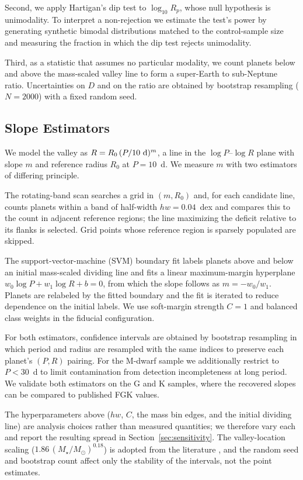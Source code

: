 \documentclass[twocolumn]{aastex701}
\newcommand{\msun}{M_\odot}
\newcommand{\slope}{m}
\begin{document}
Second, we apply Hartigan's dip test to $\log_{10} R_p$, whose null hypothesis
is unimodality. To interpret a non-rejection we estimate the test's power by
generating synthetic bimodal distributions matched to the control-sample size
and measuring the fraction in which the dip test rejects unimodality.

Third, as a statistic that assumes no particular modality, we count planets
below and above the mass-scaled valley line to form a super-Earth to
sub-Neptune ratio. Uncertainties on $D$ and on the ratio are obtained by
bootstrap resampling ($N = 2000$) with a fixed random seed.

\subsection{Slope Estimators}
\label{sec:methods_slope}

We model the valley as $R = R_0\,(P/10~{\rm d})^{\slope}$, a line in the
$\log P$--$\log R$ plane with slope $\slope$ and reference radius $R_0$ at
$P = 10$~d. We measure $\slope$ with two estimators of differing principle.

The rotating-band scan searches a grid in $(\slope, R_0)$ and, for each
candidate line, counts planets within a band of half-width $hw = 0.04$~dex and
compares this to the count in adjacent reference regions; the line maximizing
the deficit relative to its flanks is selected. Grid points whose reference
region is sparsely populated are skipped.

The support-vector-machine (SVM) boundary fit labels planets above and below
an initial mass-scaled dividing line and fits a linear maximum-margin
hyperplane $w_0 \log P + w_1 \log R + b = 0$, from which the slope follows as
$\slope = -w_0/w_1$. Planets are relabeled by the fitted boundary and the fit
is iterated to reduce dependence on the initial labels. We use soft-margin
strength $C = 1$ and balanced class weights in the fiducial configuration.

For both estimators, confidence intervals are obtained by bootstrap resampling
in which period and radius are resampled with the same indices to preserve each
planet's $(P, R)$ pairing. For the M-dwarf sample we additionally restrict to
$P < 30$~d to limit contamination from detection incompleteness at long period.
We validate both estimators on the G and K samples, where the recovered slopes
can be compared to published FGK values.

The hyperparameters above ($hw$, $C$, the mass bin edges, and the initial
dividing line) are analysis choices rather than measured quantities; we
therefore vary each and report the resulting spread in
Section~\ref{sec:sensitivity}. The valley-location scaling
($1.86\,(M_\star/\msun)^{0.18}$) is adopted from the literature
\citep{Petigura2022}, and the random seed and bootstrap count affect only the
stability of the intervals, not the point estimates.
\end{document}
